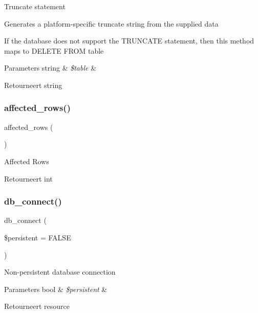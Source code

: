 Truncate statement

Generates a platform-\/specific truncate string from the supplied data

If the database does not support the T\+R\+U\+N\+C\+A\+TE statement, then this method maps to \textquotesingle{}D\+E\+L\+E\+TE F\+R\+OM table\textquotesingle{}


\begin{DoxyParams}[1]{Parameters}
string & {\em \$table} & \\
\hline
\end{DoxyParams}
\begin{DoxyReturn}{Retourneert}
string 
\end{DoxyReturn}
\mbox{\label{class_c_i___d_b__oci8__driver_a77248aaad33eb132c04cc4aa3f4bc8cb}} 
\subsubsection{\texorpdfstring{affected\_rows()}{affected\_rows()}}
{\footnotesize\ttfamily affected\+\_\+rows (\begin{DoxyParamCaption}{ }\end{DoxyParamCaption})}

Affected Rows

\begin{DoxyReturn}{Retourneert}
int 
\end{DoxyReturn}
\mbox{\label{class_c_i___d_b__oci8__driver_a52bf595e79e96cc0a7c907a9b45aeb4d}} 
\subsubsection{\texorpdfstring{db\_connect()}{db\_connect()}}
{\footnotesize\ttfamily db\+\_\+connect (\begin{DoxyParamCaption}\item[{}]{\$persistent = {\ttfamily FALSE} }\end{DoxyParamCaption})}

Non-\/persistent database connection


\begin{DoxyParams}[1]{Parameters}
bool & {\em \$persistent} & \\
\hline
\end{DoxyParams}
\begin{DoxyReturn}{Retourneert}
resource 
\end{DoxyReturn}
\mbox{\label{class_c_i___d_b__oci8__driver_a43b8d30b879d4f09ceb059b02af2bc02}} 
